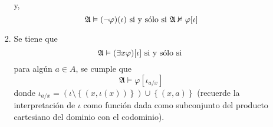 \documentclass[12pt]{report}
\newcounter{it}
\theoremstyle{largebreak}
\begin{document}
\begin{mydef}
\begin{enumerate}[label=(\textit{\arabic*})]
\begin{itemize}
\begin{enumerate}[label=(\textit{\alph*})]
                    y,
                    \begin{equation*}
                        \mathfrak{A}\vDash(\neg\varphi)(\iota)\textup{ si y sólo si }\mathfrak{A}\nvDash\varphi[\iota]
                    \end{equation*}
                    \item Se tiene que
                    \begin{equation*}
                        \mathfrak{A}\vDash(\exists x\varphi)[\iota]\textup{ si y sólo si }
                    \end{equation*}
                    para algún $a\in A$, se cumple que
                    \begin{equation*}
                        \mathfrak{A}\vDash\varphi[\iota_{a/x}]
                    \end{equation*}
                    donde $\iota_{ a/x}=\left(\iota\setminus\left\{(x,\iota(x)) \right\} \right)\cup\left\{(x,a) \right\}$ (recuerde la interpretación de $\iota$ como función dada como subconjunto del producto cartesiano del dominio con el codominio).
                \end{enumerate}
            \end{itemize}
        \end{enumerate}
    \end{mydef}
\end{document}
